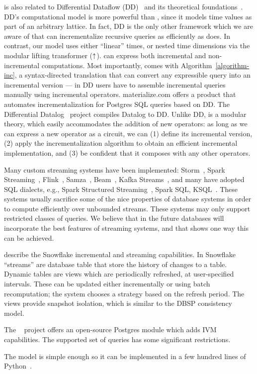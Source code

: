 \dbsp is also related to Differential Dataflow
(DD)~\cite{mcsherry-cidr13,murray-sosp13,chothia-vldb16} and its
theoretical foundations~\cite{abadi-fossacs15}.  DD's computational
model is more powerful than \dbsp, since it models time values as part
of an arbitrary lattice.  In fact, DD is the only other framework
which we are aware of that can incrementalize recursive queries as
efficiently as \dbsp does.  In contrast, our model uses either
``linear'' times, or nested time dimensions via the modular lifting
transformer (${\uparrow}$).  \dbsp can express both incremental and
non-incremental computations.  Most importantly, \dbsp comes with
Algorithm~\ref{algorithm-inc}, a syntax-directed translation that can
convert any expressible query into an incremental version --- in DD
users have to assemble incremental queries manually using incremental
operators.  materialize.com offers a product that automates
incrementalization for Postgres SQL queries based on DD.  The
Differential Datalog~\cite{ryzhyk-datalog19} project compiles Datalog
to DD.  Unlike DD, \dbsp is a modular theory, which easily
accommodates the addition of new operators: as long as we can express
a new operator as a \dbsp circuit, we can (1) define its incremental
version, (2) apply the incrementalization algorithm to obtain an
efficient incremental implementation, and (3) be confident that it
composes with any other operators.

Many custom streaming systems have been implemented:
Storm~\cite{toshnival-sigmod14}, Spark
Streaming~\cite{zaharia-sosp13}, Flink~\cite{carbone-ieee15},
Samza~\cite{noghabi-vldb17}, Beam~\cite{akidau-vldb15}, Kafka
Streams~\cite{wang-sigmod21}, and many have adopted SQL dialects,
e.g., Spark Structured Streaming~\cite{armbrust-sigmod18}, Spark SQL,
KSQL~\cite{jafarpour-edbt19}.  These systems usually sacrifice some of
the nice properties of database systems in order to compute
efficiently over unbounded streams.  These systems may only support
restricted classes of queries.  We believe that in the future
databases will incorporate the best features of streaming systems, and
that \dbsp shows one way this can be achieved.

\cite{akidau-amd23,akidau-debs24} describe the Snowflake incremental
and streaming capabilities.  In Snowflake ``streams'' are database
table that store the history of changes to a table.  Dynamic tables
are views which are periodically refreshed, at user-specified
intervals.  These can be updated either incrementally or using batch
recomputation; the system chooses a strategy based on the refresh
period.  The views provide snapshot isolation, which is similar to the
DBSP consistency model.

The ~\cite{pgivm} project offers an open-source Postgres
module which adds IVM capabilities.  The supported set of queries has
some significant restrictions.

The \dbsp model is simple enough so it can be implemented in a few
hundred lines of Python~\cite{dbsp-python}.
